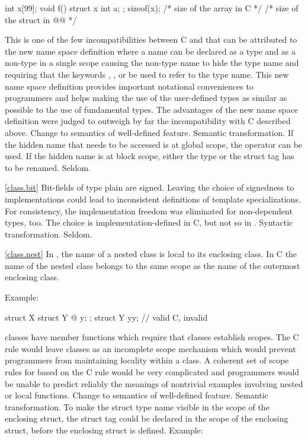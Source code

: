 \begin{codeblock}
int x[99];
void f() {
  struct x { int a; };
  sizeof(x);  /* size of the array in C */
  /* size of the struct in @\textit{\textrm{\Cpp}}@ */
}
\end{codeblock}
\rationale
This is one of the few incompatibilities between C and \Cpp that
can be attributed to the new \Cpp name space definition where a
name can be declared as a type and as a non-type in a single scope
causing the non-type name to hide the type name and requiring that
the keywords , ,  or  be used to refer to the type name.
This new name space definition provides important notational
conveniences to \Cpp programmers and helps making the use of the
user-defined types as similar as possible to the use of fundamental
types.
The advantages of the new name space definition were judged to
outweigh by far the incompatibility with C described above.
\effect
Change to semantics of well-defined feature.
\difficulty
Semantic transformation.
If the hidden name that needs to be accessed is at global scope,
the \tcode{::} \Cpp operator can be used.
If the hidden name is at block scope, either the type or the struct
tag has to be renamed.
\howwide
Seldom.

\ref{class.bit}
\change
{}%
Bit-fields of type plain  are signed.
\rationale
Leaving the choice of signedness to implementations could lead to
inconsistent definitions of template specializations. For consistency,
the implementation freedom was eliminated for non-dependent types,
too.
\effect
The choice is implementation-defined in C, but not so in \Cpp.
\difficulty
Syntactic transformation.
\howwide
Seldom.

\ref{class.nest}
\change In \Cpp, the name of a nested class is local to its enclosing class. In C
the name of the nested class belongs to the same scope as the name of the outermost enclosing class.

Example:

\begin{codeblock}
struct X {
  struct Y { @\commentellip@ } y;
};
struct Y yy;                    // valid C, invalid \Cpp
\end{codeblock}
\rationale
\Cpp classes have member functions which require that classes
establish scopes.
The C rule would leave classes as an incomplete scope mechanism
which would prevent \Cpp programmers from maintaining locality
within a class.
A coherent set of scope rules for \Cpp based on the C rule would
be very complicated and \Cpp programmers would be unable to predict
reliably the meanings of nontrivial examples involving nested or
local functions.
\effect
Change to semantics of well-defined feature.
\difficulty
Semantic transformation.
To make the struct type name visible in the scope of the enclosing
struct, the struct tag could be declared in the scope of the
enclosing struct, before the enclosing struct is defined.
Example:

